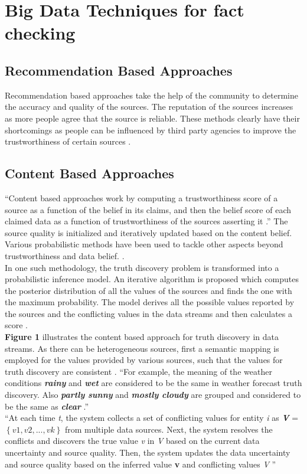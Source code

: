 \documentclass[sigconf]{acmart}
\begin{document}
\section{Big Data Techniques for fact checking}

\subsection{Recommendation Based Approaches}
Recommendation based approaches take the help of the community to determine the accuracy and quality of the sources. The reputation of the sources increases as more people agree that the source is reliable. These methods clearly have their shortcomings as people can be influenced by third party agencies to improve the trustworthiness of certain sources \cite{Berti-Equille2016}.

\subsection{Content Based Approaches}
``Content based approaches work by computing a trustworthiness score of a source as a function of the belief in its claims, and then the belief score of each claimed data as a function of trustworthiness of the sources asserting it \cite{Berti-Equille2016}.'' The source quality is initialized and iteratively updated based on the content belief. Various probabilistic methods have been used to tackle other aspects beyond trustworthiness and data belief. \cite{Berti-Equille2016}. \\
In one such methodology, the truth discovery problem is transformed into a probabilistic inference model. An iterative algorithm is proposed which computes the posterior distribution of all the values of the sources and finds the one with the maximum probability. The model derives all the possible values reported by the sources and the conflicting values in the data streams and then calculates a score \cite{Zhao2014}. \\
\textbf{Figure 1} illustrates the content based approach for truth discovery in data streams. As there can be heterogeneous sources, first a semantic mapping is employed for the values provided by various sources, such that the values for truth discovery are consistent \cite{Zhao2014}. ``For example, the meaning of the weather conditions \textbf{\textit{rainy}} and \textbf{\textit{wet}} are considered to be the same in weather forecast truth discovery. Also \textbf{\textit{partly sunny}} and \textbf{\textit{mostly cloudy}} are grouped and considered to be the same as \textbf{\textit{clear}} \cite{Zhao2014}.'' \\
``At each time \textit{t}, the system collects a set of conflicting
values for entity \textit{i} as \textbf{\textit{V}} = $\left\{{v1,v2,...,vk}\right\}$ from multiple data sources. Next, the system resolves the conflicts and discovers the true value \textit{v} in \textit{V} based on the current data uncertainty and source
quality. Then, the system updates the data uncertainty and source quality based on the inferred value \textbf{v} and conflicting values \textit{V} \cite{Zhao2014}''
\end{document}
